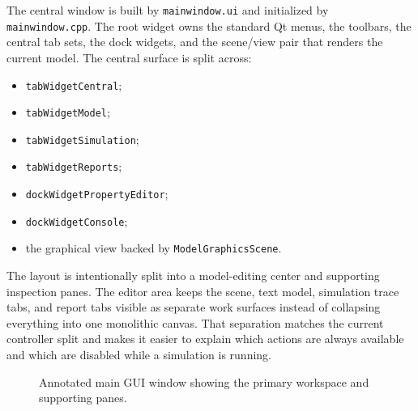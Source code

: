 The central window is built by \texttt{mainwindow.ui} and initialized by
\texttt{mainwindow.cpp}. The root widget owns the standard Qt menus, the
toolbars, the central tab sets, the dock widgets, and the scene/view pair that
renders the current model. The central surface is split across:
\begin{itemize}
\item \texttt{tabWidgetCentral};
\item \texttt{tabWidgetModel};
\item \texttt{tabWidgetSimulation};
\item \texttt{tabWidgetReports};
\item \texttt{dockWidgetPropertyEditor};
\item \texttt{dockWidgetConsole};
\item the graphical view backed by \texttt{ModelGraphicsScene}.
\end{itemize}

The layout is intentionally split into a model-editing center and supporting
inspection panes. The editor area keeps the scene, text model, simulation
trace tabs, and report tabs visible as separate work surfaces instead of
collapsing everything into one monolithic canvas. That separation matches the
current controller split and makes it easier to explain which actions are
always available and which are disabled while a simulation is running.

\begin{figure}[htbp]
\centering
{}
\caption{Annotated main GUI window showing the primary workspace and supporting panes.}
\label{fig:main-graphical-window-annotated}
\end{figure}


